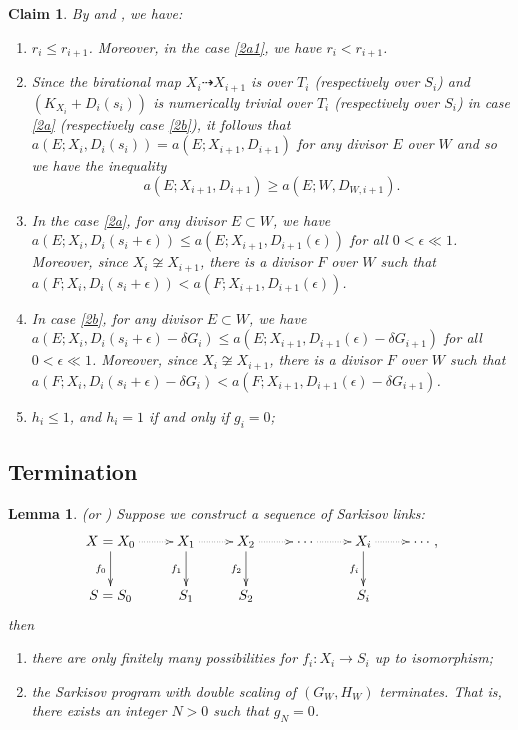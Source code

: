 \documentclass[11pt]{amsart}
\newtheorem{lem}[defn]{Lemma}
\newtheorem{claim}[defn]{Claim}
\begin{document}
\begin{claim}\label{behavior2}
  By \cite[Lemma 13.14-17]{haconMinimalModelProgram2012} and \cite[Lemma 4.2]{liuSarkisovProgramGeneralized2021}, we have:
  \begin{enumerate}
    \item $r_{i}\leqslant r_{i+1}$. Moreover, in the case \ref{2a1}, we have $r_{i}<r_{i+1}$.
    \item Since the birational map $X_{i}\dashrightarrow X_{i+1}$ is over $T_{i}$ (respectively over $S_{i}$) and $(K_{X_{i}}+D_{i}(s_{i}))$ is numerically trivial over $T_{i}$ (respectively over $S_{i}$) in case \ref{2a} (respectively case \ref{2b}), it follows that $a(E;X_{i},D_{i}(s_{i}))= a(E;X_{i+1},D_{i+1})$ for any divisor $E$ over $W$ and so we have the inequality
          \[
            a(E;X_{i+1},D_{i+1})\geqslant a(E;W,D_{W,i+1}).
          \]
    \item\label{2adicrepancy}  In the case \ref{2a}, for any divisor $E \subset W$, we have $a(E;X_{i},D_{i}(s_{i}+\epsilon))\leqslant a(E;X_{i+1},D_{i+1}(\epsilon))$ for all $0<\epsilon\ll 1$. Moreover, since $X_{i} \not\cong X_{i+1}$, there is a divisor $F$ over $W$ such that  $a(F;X_{i},D_{i}(s_{i}+\epsilon))< a(F;X_{i+1},D_{i+1}(\epsilon))$.

    \item\label{2bdiscrepancy}   In case \ref{2b}, for any divisor $E \subset W$, we have $a(E;X_{i},D_{i}(s_{i}+\epsilon)-\delta G_{i})\leqslant a(E;X_{i+1},D_{i+1}(\epsilon)-\delta G_{i+1})$ for all $0<\epsilon\ll 1$. Moreover, since $X_{i} \not\cong X_{i+1}$, there is a divisor $F$ over $W$ such that  $a(F;X_{i},D_{i}(s_{i}+\epsilon)-\delta G_{i})< a(F;X_{i+1},D_{i+1}(\epsilon)-\delta G_{i+1})$.
    \item  $h_{i}\leqslant 1$, and $h_{i}=1$ if and only if $g_{i}=0$;
  \end{enumerate}
\end{claim}
\subsection{Termination}
\begin{lem}\label{termination2}
  \cite[Lemma 13.18-19]{haconMinimalModelProgram2012} (or \cite[Lemma 4.9]{liuSarkisovProgramGeneralized2021}) Suppose we construct a sequence of Sarkisov links:
  \[
    \xymatrix{
    X=X_0\ar@{.>}[r]\ar[d]_{f_0}&X_{1}\ar@{.>}[r]\ar[d]_{f_1}& X_{2}\ar[d]_{f_2}\ar@{.>}[r] &\cdots\ar@{.>}[r]&X_{i}\ar[d]_{f_i}\ar@{.>}[r] &\cdots\\
    S=S_{0}&S_{1} &S_{2}&&S_{i}
    }
    ,\]
  then
  \begin{enumerate}
    \item there are only finitely many possibilities for $f_{i}:X_{i}\to S_{i}$ up to isomorphism;
    \item the Sarkisov program with double scaling of $(G_{W},H_{W})$ terminates. That is, there exists an integer $N>0$ such that $g_{N}=0$.
  \end{enumerate}
\end{lem}
\end{document}
